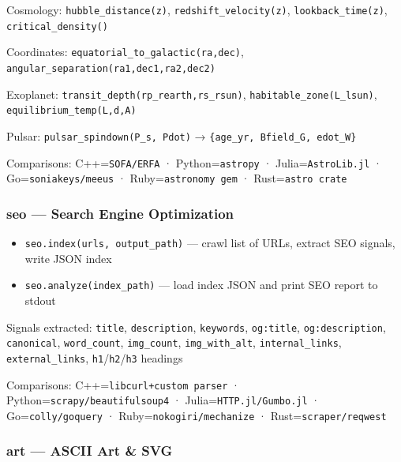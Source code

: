 \documentclass[
]{article}
\providecommand{\tightlist}{%
  \setlength{\itemsep}{0pt}\setlength{\parskip}{0pt}}
\begin{document}
Cosmology: \texttt{hubble\_distance(z)}, \texttt{redshift\_velocity(z)},
\texttt{lookback\_time(z)}, \texttt{critical\_density()}

Coordinates: \texttt{equatorial\_to\_galactic(ra,dec)},
\texttt{angular\_separation(ra1,dec1,ra2,dec2)}

Exoplanet: \texttt{transit\_depth(rp\_rearth,rs\_rsun)},
\texttt{habitable\_zone(L\_lsun)}, \texttt{equilibrium\_temp(L,d,A)}

Pulsar: \texttt{pulsar\_spindown(P\_s,\ Pdot)} →
\texttt{\{age\_yr,\ Bfield\_G,\ edot\_W\}}

Comparisons: C++=\texttt{SOFA/ERFA} · Python=\texttt{astropy} ·
Julia=\texttt{AstroLib.jl} · Go=\texttt{soniakeys/meeus} ·
Ruby=\texttt{astronomy\ gem} · Rust=\texttt{astro\ crate}

\subsubsection{seo --- Search Engine
Optimization}\label{seo-search-engine-optimization}

\begin{itemize}
\tightlist
\item
  \texttt{seo.index(urls,\ output\_path)} --- crawl list of URLs,
  extract SEO signals, write JSON index
\item
  \texttt{seo.analyze(index\_path)} --- load index JSON and print SEO
  report to stdout
\end{itemize}

Signals extracted: \texttt{title}, \texttt{description},
\texttt{keywords}, \texttt{og:title}, \texttt{og:description},
\texttt{canonical}, \texttt{word\_count}, \texttt{img\_count},
\texttt{img\_with\_alt}, \texttt{internal\_links},
\texttt{external\_links}, \texttt{h1}/\texttt{h2}/\texttt{h3} headings

Comparisons: C++=\texttt{libcurl+custom\ parser} ·
Python=\texttt{scrapy/beautifulsoup4} · Julia=\texttt{HTTP.jl/Gumbo.jl}
· Go=\texttt{colly/goquery} · Ruby=\texttt{nokogiri/mechanize} ·
Rust=\texttt{scraper/reqwest}

\subsubsection{art --- ASCII Art \& SVG}\label{art-ascii-art-svg}
\end{document}

